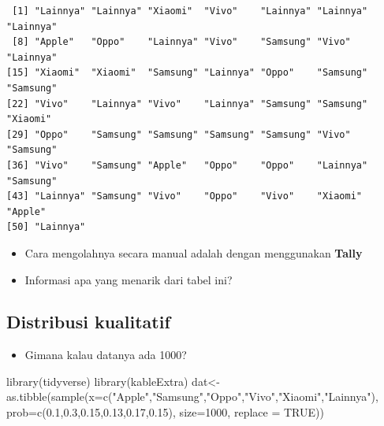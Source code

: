 \documentclass[
  letterpaper,
  DIV=11,
  numbers=noendperiod]{scrartcl}
\newenvironment{Shaded}{\begin{snugshade}}{\end{snugshade}}
\newcommand{\AttributeTok}[1]{\textcolor[rgb]{0.40,0.45,0.13}{#1}}
\newcommand{\ConstantTok}[1]{\textcolor[rgb]{0.56,0.35,0.01}{#1}}
\newcommand{\DecValTok}[1]{\textcolor[rgb]{0.68,0.00,0.00}{#1}}
\newcommand{\FloatTok}[1]{\textcolor[rgb]{0.68,0.00,0.00}{#1}}
\newcommand{\FunctionTok}[1]{\textcolor[rgb]{0.28,0.35,0.67}{#1}}
\newcommand{\NormalTok}[1]{\textcolor[rgb]{0.00,0.23,0.31}{#1}}
\newcommand{\OtherTok}[1]{\textcolor[rgb]{0.00,0.23,0.31}{#1}}
\newcommand{\StringTok}[1]{\textcolor[rgb]{0.13,0.47,0.30}{#1}}
\providecommand{\tightlist}{%
  \setlength{\itemsep}{0pt}\setlength{\parskip}{0pt}}\usepackage{longtable,booktabs,array}
\begin{document}
\begin{verbatim}
 [1] "Lainnya" "Lainnya" "Xiaomi"  "Vivo"    "Lainnya" "Lainnya" "Lainnya"
 [8] "Apple"   "Oppo"    "Lainnya" "Vivo"    "Samsung" "Vivo"    "Lainnya"
[15] "Xiaomi"  "Xiaomi"  "Samsung" "Lainnya" "Oppo"    "Samsung" "Samsung"
[22] "Vivo"    "Lainnya" "Vivo"    "Lainnya" "Samsung" "Samsung" "Xiaomi" 
[29] "Oppo"    "Samsung" "Samsung" "Samsung" "Samsung" "Vivo"    "Samsung"
[36] "Vivo"    "Samsung" "Apple"   "Oppo"    "Oppo"    "Lainnya" "Samsung"
[43] "Lainnya" "Samsung" "Vivo"    "Oppo"    "Vivo"    "Xiaomi"  "Apple"  
[50] "Lainnya"
\end{verbatim}

\begin{itemize}
\item
  Cara mengolahnya secara manual adalah dengan menggunakan
  \textbf{Tally}
\item
  Informasi apa yang menarik dari tabel ini?
\end{itemize}

\hypertarget{distribusi-kualitatif-1}{%
\subsection{Distribusi kualitatif}\label{distribusi-kualitatif-1}}

\begin{itemize}
\tightlist
\item
  Gimana kalau datanya ada 1000?
\end{itemize}

\begin{Shaded}
\begin{Highlighting}[]
\FunctionTok{library}\NormalTok{(tidyverse)}
\FunctionTok{library}\NormalTok{(kableExtra)}
\NormalTok{dat}\OtherTok{\textless{}{-}}\FunctionTok{as.tibble}\NormalTok{(}\FunctionTok{sample}\NormalTok{(}\AttributeTok{x=}\FunctionTok{c}\NormalTok{(}\StringTok{"Apple"}\NormalTok{,}\StringTok{"Samsung"}\NormalTok{,}\StringTok{"Oppo"}\NormalTok{,}\StringTok{"Vivo"}\NormalTok{,}\StringTok{"Xiaomi"}\NormalTok{,}\StringTok{"Lainnya"}\NormalTok{),}
                      \AttributeTok{prob=}\FunctionTok{c}\NormalTok{(}\FloatTok{0.1}\NormalTok{,}\FloatTok{0.3}\NormalTok{,}\FloatTok{0.15}\NormalTok{,}\FloatTok{0.13}\NormalTok{,}\FloatTok{0.17}\NormalTok{,}\FloatTok{0.15}\NormalTok{),}
                      \AttributeTok{size=}\DecValTok{1000}\NormalTok{,}
                      \AttributeTok{replace =} \ConstantTok{TRUE}\NormalTok{))}
\end{Highlighting}
\end{Shaded}
\end{document}
